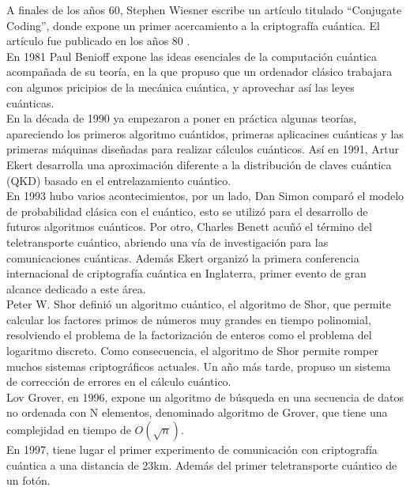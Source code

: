A finales de los años 60, Stephen Wiesner escribe un artículo titulado ``Conjugate Coding'', donde expone un primer acercamiento a la criptografía cuántica. El artículo fue publicado en los años 80 \cite{computacion-cuantica-crono}.\\

En 1981 Paul Benioff expone las ideas esenciales de la computación cuántica acompañada de su teoría, en la que propuso que un ordenador clásico trabajara con algunos pricipios de la mecánica cuántica, y aprovechar así las leyes cuánticas.\\


En la década de 1990 ya empezaron a poner en práctica algunas teorías, apareciendo los primeros algoritmo cuántidos, primeras aplicacines cuánticas y las primeras máquinas diseñadas para realizar cálculos cuánticos. Así en 1991, Artur Ekert desarrolla una aproximación diferente a la distribución de claves cuántica (QKD) basado en el entrelazamiento cuántico.\\

En 1993 hubo varios acontecimientos, por un lado, Dan Simon comparó el modelo de probabilidad clásica con el cuántico, esto se utilizó para el desarrollo de futuros algoritmos cuánticos. Por otro, Charles Benett acuñó el término del teletransporte cuántico, abriendo una vía de investigación para las comunicaciones cuánticas. Además Ekert organizó la primera conferencia internacional de criptografía cuántica en Inglaterra, primer evento de gran alcance dedicado a este área.\\

Peter W. Shor definió un algoritmo cuántico, el algoritmo de Shor, que permite calcular los factores primos de números muy grandes en tiempo polinomial, resolviendo el problema de la factorización de enteros como el problema del logaritmo discreto. Como consecuencia, el algoritmo de Shor permite romper muchos sistemas criptográficos actuales. Un año más tarde, propuso un sistema de corrección de errores en el cálculo cuántico.\\

Lov Grover, en 1996, expone un algoritmo de búsqueda en una secuencia de datos no ordenada con N elementos, denominado algoritmo de Grover, que tiene una complejidad en tiempo de $O(\sqrt{n})$.\\

En 1997, tiene lugar el primer experimento de comunicación con criptografía cuántica a una distancia de 23km. Además del primer teletransporte cuántico de un fotón.\\

